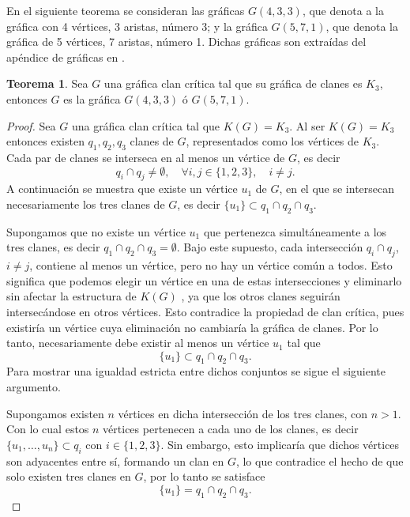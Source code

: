 \documentclass[12pt]{book}
\theoremstyle{definition}
\newtheorem{theorem}{Teorema}[chapter]
\begin{document}
En el siguiente teorema se consideran las gráficas $G(4,3,3)$, que denota a la gráfica con 4 vértices, 3 aristas, número 3; y la gráfica $G(5,7,1)$, que denota la gráfica de 5 vértices, 7 aristas, número 1. Dichas gráficas son extraídas del apéndice de gráficas en \cite{Harary:1969}.
\begin{theorem}
	Sea $G$ una gráfica clan crítica tal que su gráfica de clanes es $K_3$, entonces $G$ es la gráfica $G(4,3,3)$ ó $G(5,7,1)$.
\end{theorem}
\begin{proof}
Sea $G$ una gráfica clan crítica tal que $K(G)=K_3$. Al ser $K(G)=K_3$ entonces existen $q_1,q_2,q_3$ clanes de $G$, representados como los vértices de $K_3$. Cada par de clanes se interseca en al menos un vértice de $G$, es decir
\begin{equation*}
q_i\cap q_j\neq \emptyset, \quad \forall i,j\in\{1,2,3\},\quad i\neq j.
\end{equation*}
A continuación se muestra que existe un vértice $u_1$ de $G$, en el que se intersecan necesariamente los tres clanes de $G$, es decir $\{u_1\}\subset q_1\cap q_2 \cap q_3$. 

Supongamos que no existe un vértice $u_1$ que pertenezca simultáneamente a los tres clanes, es decir  $q_1\cap q_2 \cap q_3=\emptyset$. Bajo este supuesto, cada intersección $q_i\cap q_j$, $i\neq j$, contiene al menos un vértice, pero no hay un vértice común a todos. Esto significa que podemos elegir un vértice en una de estas intersecciones y eliminarlo sin afectar la estructura de $K(G)$ , ya que los otros clanes seguirán intersecándose en otros vértices. Esto contradice la propiedad de clan crítica, pues existiría un vértice cuya eliminación no cambiaría la gráfica de clanes.
Por lo tanto, necesariamente debe existir al menos un vértice $u_1$ tal que
\begin{equation*}
\{u_1\}\subset q_1\cap q_2 \cap q_3.
\end{equation*}
Para mostrar una igualdad estricta entre dichos conjuntos se sigue el siguiente argumento.

Supongamos existen $n$ vértices en dicha intersección de los tres clanes, con $n>1$. Con lo cual estos $n$ vértices pertenecen a cada uno de los clanes, es decir $\{u_1, \dots , u_n\} \subset q_i$ con $i\in\{1,2,3\}$. Sin embargo, esto implicaría que dichos vértices son adyacentes entre sí, formando un clan en $G$, lo que contradice el hecho de que solo existen tres clanes en $G$, por lo tanto se satisface 
\begin{equation*}
	\{u_1\}=q_1\cap q_2 \cap q_3.
\end{equation*}


\end{proof}
\end{document}
